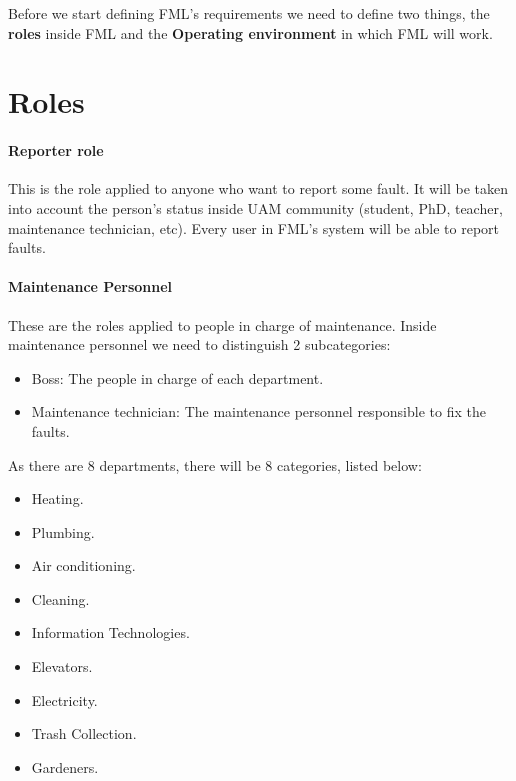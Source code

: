 
Before we start defining FML's requirements we need to define two things, the \textbf{roles} inside FML and the \textbf{Operating environment} in which FML will work.


\label{chapRequirements}
\section{Roles}

\paragraph{Reporter role} \label{ReporterRole} This is the role applied to anyone who want to report some fault. It will be taken into account the person's status inside UAM community (student, PhD, teacher, maintenance technician, etc). Every user in FML's system will be able to report faults.

\paragraph{Maintenance Personnel} \label{MaintenancePersonnel}

These are the roles applied to people in charge of maintenance. Inside maintenance personnel we need to distinguish 2 subcategories:

\begin{itemize}
\item Boss: The people in charge of each department.
\item Maintenance technician: The maintenance personnel responsible to fix the faults.
\end{itemize}

As there are 8 departments, there will be 8 categories, listed below:

\begin{itemize}
\item Heating.
\item Plumbing.
\item Air conditioning.
\item Cleaning.
\item Information Technologies.
\item Elevators.
\item Electricity.
\item Trash Collection.
\item Gardeners.
\end{itemize}

